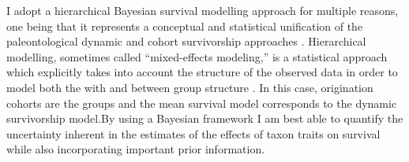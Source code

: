 \documentclass[12pt,letterpaper]{article}
\begin{document}
I adopt a hierarchical Bayesian survival modelling approach for multiple reasons, one being that it represents a conceptual and statistical unification of the paleontological dynamic and cohort survivorship approaches \citep{VanValen1973,VanValen1979,Raup1978,Raup1975,Foote1988,Baumiller1993,Simpson2006}. Hierarchical modelling, sometimes called ``mixed-effects modeling,'' is a statistical approach which explicitly takes into account the structure of the observed data in order to model both the with and between group structure \citep{Gelman2013d,Gelman2007}. In this case, origination cohorts are the groups and the mean survival model corresponds to the dynamic survivorship model.By using a Bayesian framework I am best able to quantify the uncertainty inherent in the estimates of the effects of taxon traits on survival while also incorporating important prior information.
\end{document}
